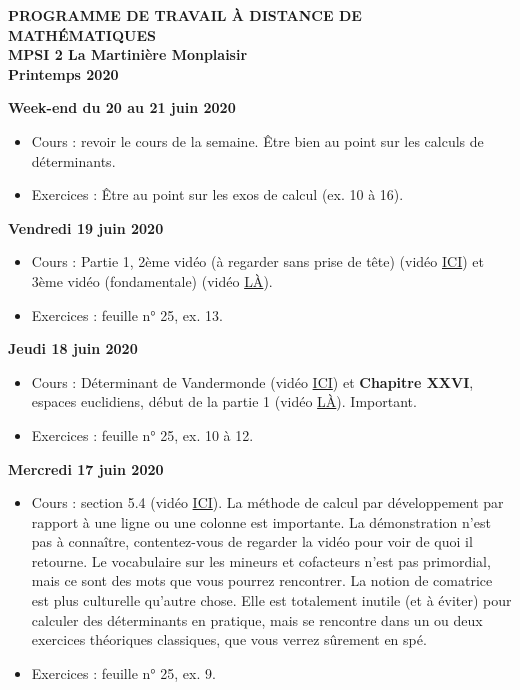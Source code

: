 \documentclass[12pt,a4paper]{article}
\begin{document}
\begin{center}
\Large\bf PROGRAMME DE TRAVAIL À DISTANCE DE MATHÉMATIQUES\\
MPSI 2 La Martinière Monplaisir\\ Printemps 2020
\end{center}
\vspace{1cm}
\vspace{.4cm}


\noindent\textbf{Week-end du 20 au 21 juin 2020}
\begin{itemize}
\item Cours : revoir le cours de la semaine. Être bien au point sur les calculs de déterminants. 
\item Exercices : Être au point sur les exos de calcul (ex. 10 à 16).\vspace{.4cm}
\end{itemize}

\noindent\textbf{Vendredi 19 juin 2020}
\begin{itemize}
\item Cours : Partie 1, 2ème vidéo (à regarder sans prise de tête) (vidéo \href{https://youtu.be/mbUEkYMIIAk}{ ICI}) et 3ème vidéo (fondamentale) (vidéo \href{https://youtu.be/TLuVBtGuaTM}{ LÀ}). 
\item Exercices : feuille n° 25, ex. 13.\vspace{.4cm}
\end{itemize}

\noindent\textbf{Jeudi 18 juin 2020}
\begin{itemize}
\item Cours : Déterminant de Vandermonde (vidéo \href{https://youtu.be/CUqKYLTe87c}{ ICI}) et \textbf{Chapitre XXVI}, espaces euclidiens, début de la partie 1 (vidéo \href{https://youtu.be/NFv0SAbY4tg}{ LÀ}). Important.
\item Exercices : feuille n° 25, ex. 10 à 12.\vspace{.4cm}
\end{itemize}
 
\noindent\textbf{Mercredi 17 juin 2020}
\begin{itemize}
\item Cours : section 5.4 (vidéo \href{https://youtu.be/gX6FpFLPAxY}{ ICI}). La méthode de calcul par développement par rapport à une ligne ou une colonne est importante. La démonstration n'est pas à connaître, contentez-vous de regarder la vidéo pour voir de quoi il retourne. Le vocabulaire sur les mineurs et cofacteurs n'est pas primordial, mais ce sont des mots que vous pourrez rencontrer. La notion de comatrice est plus culturelle qu'autre chose. Elle est totalement inutile (et à éviter) pour calculer des déterminants en pratique, mais se rencontre dans un ou deux exercices théoriques classiques, que vous verrez sûrement en spé.
\item Exercices : feuille n° 25, ex. 9.\vspace{.4cm}
\end{itemize}
\end{document}

